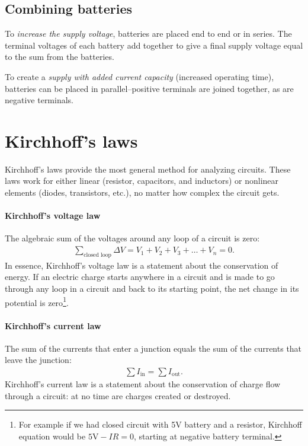 \documentclass[../../document]{subfiles}
\begin{document}
\subsection{Combining batteries}
To \emph{increase the supply voltage}, batteries are
placed end to end or in series. The terminal voltages of each battery add together
to give a final supply voltage equal to the sum from the batteries. \cite[p. 67]{practical_electronics}

To create a \emph{supply with added current capacity} (increased operating time),
batteries can be placed in parallel--positive terminals are joined together, as
are negative terminals. \cite{practical_electronics}

\section{Kirchhoff's laws}
Kirchhoff’s laws provide the most general method for analyzing circuits. These
laws work for either linear (resistor, capacitors, and inductors) or nonlinear
elements (diodes, transistors, etc.), no matter how complex the circuit gets.
\cite{practical_electronics}
\paragraph*{Kirchhoff's voltage law}
The algebraic sum of the voltages around any loop of a circuit is zero:
\begin{gather}
	\sum_{\text{closed loop}}\Delta V = V_1+V_2+V_3+\dots+V_n = 0.
\end{gather}
In essence, Kirchhoff’s voltage law is a statement about the conservation of
energy. If an electric charge starts anywhere in a circuit and is made to go
through any loop in a circuit and back to its starting point, the net change in
its potential is zero\footnote{For example if we had closed circuit with 5\unit{\volt}
	battery and a resistor, Kirchhoff equation would be \(5\unit{\volt}-IR=0\), starting at
negative battery terminal.}. \cite{practical_electronics}
\paragraph*{Kirchhoff's current law}
The sum of the currents that enter a junction equals the sum of the currents
that leave the junction:
\begin{gather}
	\sum I_{\text{in}} = \sum I_{\text{out}}.
\end{gather}
Kirchhoff’s current law is a statement about the conservation of charge flow
through a circuit: at no time are charges created or
destroyed. \cite{practical_electronics}
\end{document}
